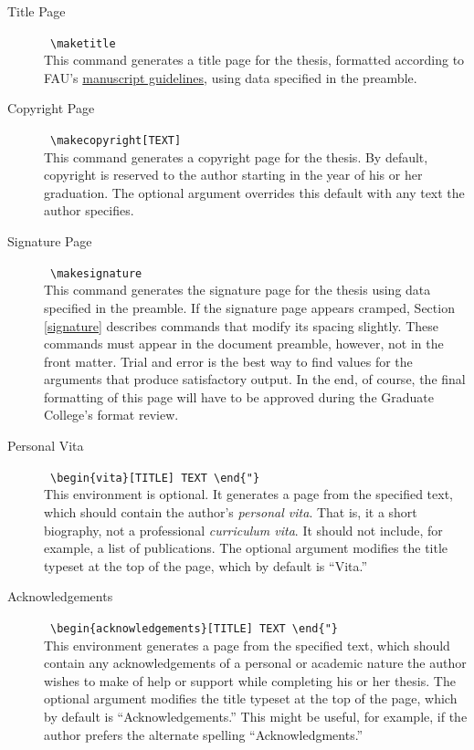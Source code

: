 \documentclass[11pt]{article}
\newcommand\guide{{http://www.fau.edu/graduate/forms-and-procedures/degree-completion/thesis-and-dissertation/index.php}}
\begin{document}
\begin{description}

\item[Title Page] \dotfill\ \verb=\maketitle=\\
This command generates a title page for the thesis, formatted according to FAU's 
\href\guide{manuscript guidelines}, 
using data specified in the preamble.

\item[Copyright Page] \dotfill\ \verb=\makecopyright[TEXT]=\\
This command generates a copyright page for the thesis.  By default, copyright is reserved to the author starting in the year of his or her graduation.  The optional argument overrides this default with any text the author specifies.

\item[Signature Page] \dotfill\ \verb=\makesignature=\\
This command generates the signature page for the thesis using data specified in the preamble.  If the signature page appears cramped, Section \ref{signature} describes commands that modify its spacing slightly.  These commands must appear in the document preamble, however, not in the front matter.  Trial and error is the best way to find values for the arguments that produce satisfactory output.  In the end, of course, the final formatting of this page will have to be approved during the Graduate College's format review.

\item[\llap{*}Personal Vita] \dotfill\ \verb=\begin{vita}[TITLE] TEXT \end{"}=\\
This environment is optional.  It generates a page from the specified text, which should contain the author's \textit{personal vita}.  That is, it a short biography, not a professional \textit{curriculum vita}.  It should not include, for example, a list of publications.  The optional argument modifies the title typeset at the top of the page, which by default is ``Vita.''

\item[Acknowledgements] \dotfill\ \verb=\begin{acknowledgements}[TITLE] TEXT \end{"}=\\
This environment generates a page from the specified text, which should contain any acknowledgements of a personal or academic nature the author wishes to make of help or support while completing his or her thesis.  The optional argument modifies the title typeset at the top of the page, which by default is ``Acknowledgements.''  This might be useful, for example, if the author prefers the alternate spelling ``Acknowledgments.''


\end{description}
\end{document}
